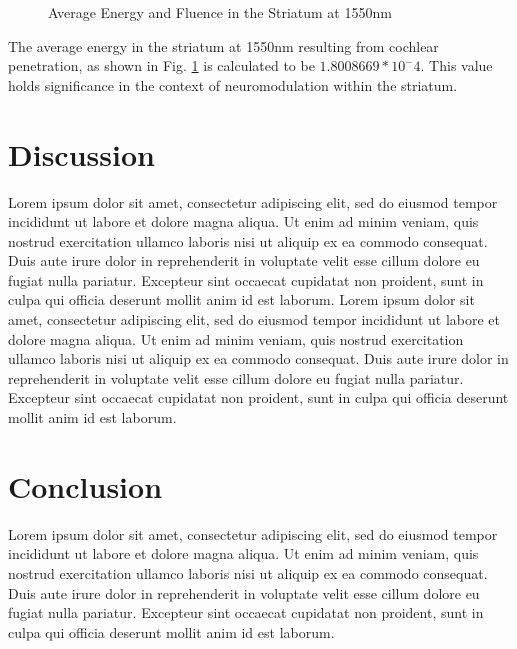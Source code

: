 \documentclass[journal,twoside,web]{ieeecolor}
\begin{document}
\begin{figure}[hbt!]
    \caption{\label{fig:Avg1550} Average Energy and Fluence in the Striatum at 1550nm}
\end{figure}
The average energy in the striatum at 1550nm resulting from cochlear penetration, as shown in Fig. \ref{fig:Avg1550} is calculated to 
be $1.8008669*10^-4$. This value holds significance in the context of neuromodulation within the striatum.

\section{Discussion}
\label{sec:next steps}
Lorem ipsum dolor sit amet, consectetur adipiscing elit, sed do eiusmod tempor incididunt ut labore et dolore magna aliqua. Ut enim ad minim veniam, 
quis nostrud exercitation ullamco laboris nisi ut aliquip ex ea commodo consequat. Duis aute irure dolor in reprehenderit in voluptate velit esse 
cillum dolore eu fugiat nulla pariatur. Excepteur sint occaecat cupidatat non proident, sunt in culpa qui officia deserunt mollit anim id est laborum.
Lorem ipsum dolor sit amet, consectetur adipiscing elit, sed do eiusmod tempor incididunt ut labore et dolore magna aliqua. Ut enim ad minim veniam, 
quis nostrud exercitation ullamco laboris nisi ut aliquip ex ea commodo consequat. Duis aute irure dolor in reprehenderit in voluptate velit esse cillum 
dolore eu fugiat nulla pariatur. Excepteur sint occaecat cupidatat non proident, sunt in culpa qui officia deserunt mollit anim id est laborum.

\section{Conclusion}
\label{sec:conclusion}
Lorem ipsum dolor sit amet, consectetur adipiscing elit, sed do eiusmod tempor incididunt ut labore et dolore magna aliqua. Ut enim ad minim veniam, 
quis nostrud exercitation ullamco laboris nisi ut aliquip ex ea commodo consequat. Duis aute irure dolor in reprehenderit in voluptate velit esse 
cillum dolore eu fugiat nulla pariatur. Excepteur sint occaecat cupidatat non proident, sunt in culpa qui officia deserunt mollit anim id est laborum.
\end{document}
